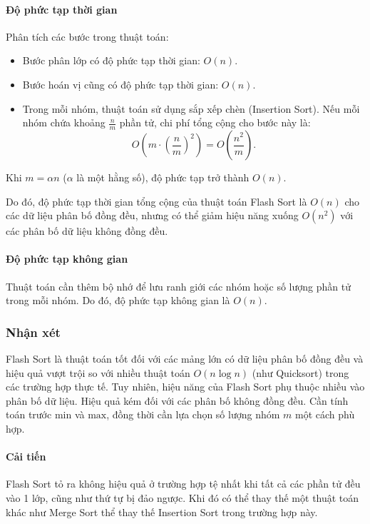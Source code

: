 \paragraph{Độ phức tạp thời gian}
Phân tích các bước trong thuật toán:
\begin{itemize}
    \item Bước phân lớp có độ phức tạp thời gian: \( O(n) \).
\item Bước hoán vị cũng có độ phức tạp thời gian: \( O(n) \).
\item Trong mỗi nhóm, thuật toán sử dụng sắp xếp chèn (Insertion Sort). Nếu mỗi nhóm chứa khoảng \( \frac{n}{m} \) phần tử, chi phí tổng cộng cho bước này là:
\[
O\left( m \cdot \left(\frac{n}{m}\right)^2 \right) = O\left(\frac{n^2}{m}\right).
\]
\end{itemize}

Khi \( m = \alpha n \) (\( \alpha \) là một hằng số), độ phức tạp trở thành \( O(n) \).

Do đó, độ phức tạp thời gian tổng cộng của thuật toán Flash Sort là \( O(n) \) cho các dữ liệu phân bố đồng đều, nhưng có thể giảm hiệu năng xuống \( O(n^2) \) với các phân bố dữ liệu không đồng đều.

\paragraph{Độ phức tạp không gian}

    Thuật toán cần thêm bộ nhớ để lưu ranh giới các nhóm hoặc số lượng phần tử trong mỗi nhóm. Do đó, độ phức tạp không gian là \( O(n) \).
\subsubsection{Nhận xét}
Flash Sort là thuật toán tốt đối với các mảng lớn có dữ liệu phân bố đồng đều và hiệu quả vượt trội so với nhiều thuật toán \( O(n \log n) \) (như Quicksort) trong các trường hợp thực tế. Tuy nhiên, hiệu năng của Flash Sort phụ thuộc nhiều vào phân bố dữ liệu. Hiệu quả kém đối với các phân bố không đồng đều. Cần tính toán trước \( \text{min} \) và \( \text{max} \), đồng thời cần lựa chọn số lượng nhóm \( m \) một cách phù hợp.


\paragraph{Cải tiến} 
Flash Sort tỏ ra không hiệu quả ở trường hợp tệ nhất khi tất cả các phần tử đều vào 1 lớp, cũng như thứ tự bị đảo ngược. Khi đó có thể thay thế một thuật toán khác như Merge Sort thể thay thế Insertion Sort trong trường hợp này.
